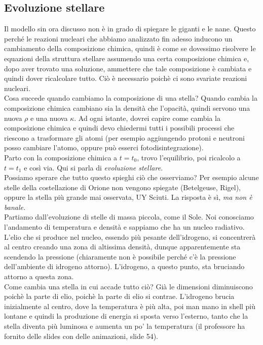 \documentclass[a4paper,11pt]{article}
\begin{document}
\subsection{Evoluzione stellare}
Il modello sin ora discusso non è in grado di spiegare le giganti e le nane. Questo perché le reazioni nucleari che abbiamo analizzato fin adesso inducono un cambiamento della composizione chimica, quindi è come se dovessimo risolvere le equazioni della struttura stellare assumendo una certa composizione chimica e, dopo aver trovato una soluzione, ammettere che tale composizione è cambiata e quindi dover ricalcolare tutto. Ciò è necessario poichè ci sono svariate reazioni nucleari.\\
Cosa succede quando cambiamo la composizione di una stella? Quando cambia la composizione chimica cambiano sia la densità che l'opacità, quindi servono una nuova $\rho$ e una nuova $\kappa$. Ad ogni istante, dovrei capire come cambia la composizione chimica e quindi devo chiedermi tutti i possibili processi che riescono a trasformare gli atomi (per esempio aggiungendo protoni e neutroni posso cambiare l'atomo, oppure può esserci fotodisintegrazione).\\
Parto con la composizione chimica a $t=t_0$, trovo l'equilibrio, poi ricalcolo a $t=t_1$ e così via. Qui si parla di \textit{evoluzione stellare.}\\
Possiamo sperare che tutto questo spieghi ciò che osserviamo? Per esempio alcune stelle della costellazione di Orione non vengono spiegate (Betelgeuse, Rigel), oppure la stella più grande mai osservata, UY Sciuti. La risposta è sì, \textit{ma non è banale.}\\
Partiamo dall'evoluzione di stelle di massa piccola, come il Sole. Noi conosciamo l'andamento di temperatura e densità e sappiamo che ha un nucleo radiativo. L'elio che si produce nel nucleo, essendo più pesante dell'idrogeno, si concentrerà al centro creando una zona di altissima densità, dunque apparentemente sta scendendo la pressione (chiaramente non è possibile perché c'è la pressione dell'ambiente di idrogeno attorno). L'idrogeno, a questo punto, sta bruciando attorno a questa zona.\\ Come cambia una stella in cui accade tutto ciò? Già le dimensioni diminuiscono poichè la parte di elio, poichè la parte di elio si contrae. L'idrogeno brucia inizialmente al centro, dove la temperatura è più alta, poi man mano in shell più lontane e quindi la produzione di energia si sposta verso l'esterno, tanto che la stella diventa più luminosa e aumenta un po' la temperatura (il professore ha fornito delle slides con delle animazioni, slide 54).\\
\end{document}
